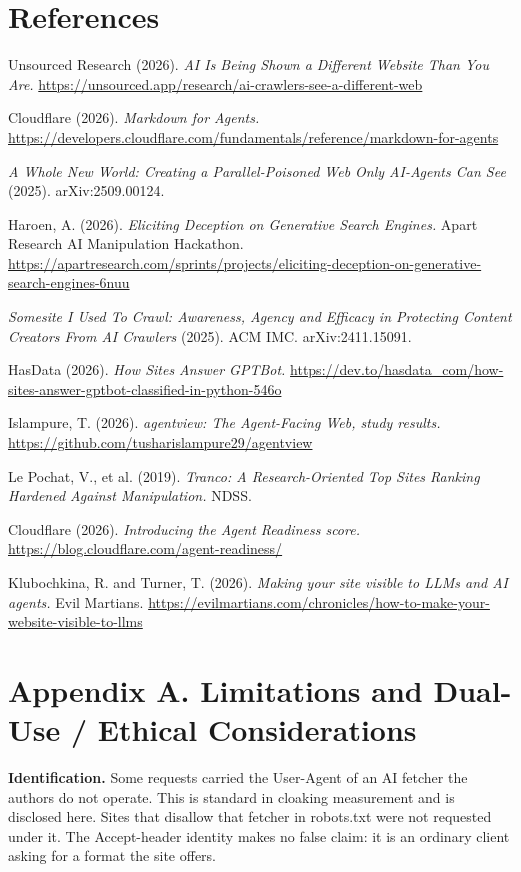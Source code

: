 \documentclass[10pt,a4paper]{article}
\begin{document}
\section*{References}
\begin{enumerate}[label={[\arabic*]},leftmargin=2.2em]\small
\item Unsourced Research (2026). \emph{AI Is Being Shown a Different Website Than You Are.} \url{https://unsourced.app/research/ai-crawlers-see-a-different-web}
\item Cloudflare (2026). \emph{Markdown for Agents.} \url{https://developers.cloudflare.com/fundamentals/reference/markdown-for-agents}
\item \emph{A Whole New World: Creating a Parallel-Poisoned Web Only AI-Agents Can See} (2025). arXiv:2509.00124.
\item Haroen, A. (2026). \emph{Eliciting Deception on Generative Search Engines.} Apart Research AI Manipulation Hackathon. \url{https://apartresearch.com/sprints/projects/eliciting-deception-on-generative-search-engines-6nuu}
\item \emph{Somesite I Used To Crawl: Awareness, Agency and Efficacy in Protecting Content Creators From AI Crawlers} (2025). ACM IMC. arXiv:2411.15091.
\item HasData (2026). \emph{How Sites Answer GPTBot.} \url{https://dev.to/hasdata_com/how-sites-answer-gptbot-classified-in-python-546o}
\item Islampure, T. (2026). \emph{agentview: The Agent-Facing Web, study results.} \url{https://github.com/tusharislampure29/agentview}
\item Le Pochat, V., et al. (2019). \emph{Tranco: A Research-Oriented Top Sites Ranking Hardened Against Manipulation.} NDSS.
\item Cloudflare (2026). \emph{Introducing the Agent Readiness score.} \url{https://blog.cloudflare.com/agent-readiness/}
\item Klubochkina, R. and Turner, T. (2026). \emph{Making your site visible to LLMs and AI agents.} Evil Martians. \url{https://evilmartians.com/chronicles/how-to-make-your-website-visible-to-llms}
\end{enumerate}

\appendix
\section*{Appendix A. Limitations and Dual-Use / Ethical Considerations}
\textbf{Identification.} Some requests carried the User-Agent of an AI fetcher the authors do not operate. This is standard in cloaking measurement and is disclosed here. Sites that disallow that fetcher in robots.txt were not requested under it. The Accept-header identity makes no false claim: it is an ordinary client asking for a format the site offers.
\end{document}
